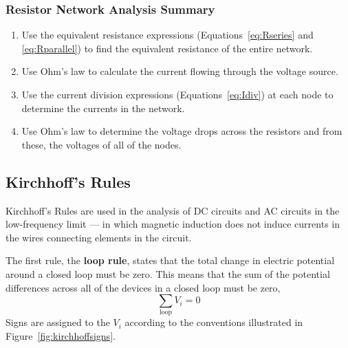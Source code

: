 \documentclass[11pt]{article}
\begin{document}
\subsubsection*{Resistor Network Analysis Summary}
\begin{enumerate}
\item Use the equivalent resistance expressions
  (Equations~\ref{eq:Rseries} and \ref{eq:Rparallel}) to find the
  equivalent resistance of the entire network.

\item Use Ohm's law to calculate the current flowing through the
  voltage source.

\item Use the current division expressions (Equations~\ref{eq:Idiv})
  at each node to determine the currents in the network.

\item Use Ohm's law to determine the voltage drops across the
  resistors and from these, the voltages of all of the nodes.
\end{enumerate}
\begin{latexonly}
  \noindent
  \hrulefill
\end{latexonly}
\htmlrule
  
\subsection{Kirchhoff's Rules}
\label{sec:kirchhoff}

Kirchhoff's Rules are used in the analysis of DC circuits and AC
circuits in the low-frequency limit --- in which magnetic induction
does not induce currents in the wires connecting elements in the
circuit.

The first rule, the \textbf{loop rule}, states that the total change
in electric potential around a closed loop must be zero. This means
that the sum of the potential differences across all of the devices in
a closed loop must be zero,
\begin{equation}
  \sum_\mathrm{loop} V_i = 0
  \label{eq:Loop}
\end{equation}
Signs are assigned to the $V_i$ according to the conventions
illustrated in Figure~\ref{fig:kirchhoffsigns}.
\end{document}
